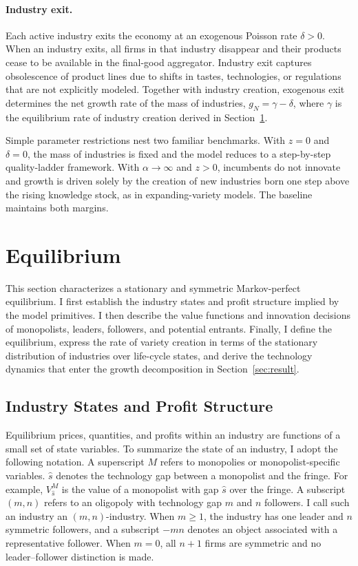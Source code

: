 \documentclass[12pt]{article}
\begin{document}
\paragraph{Industry exit.}

Each active industry exits the economy at an exogenous Poisson rate \(\delta > 0\). When an industry exits, all firms in that industry disappear and their products cease to be available in the final-good aggregator. Industry exit captures obsolescence of product lines due to shifts in tastes, technologies, or regulations that are not explicitly modeled. Together with industry creation, exogenous exit determines the net growth rate of the mass of industries, \(g_N=\gamma-\delta\), where \(\gamma\) is the equilibrium rate of industry creation derived in Section~\ref{sec:eqm}.

\bigskip

Simple parameter restrictions nest two familiar benchmarks. With \(z = 0\) and \(\delta = 0\), the mass of industries is fixed and the model reduces to a step-by-step quality-ladder framework. With \(\alpha\rightarrow\infty\) and \(z > 0\), incumbents do not innovate and growth is driven solely by the creation of new industries born one step above the rising knowledge stock, as in expanding-variety models. The baseline maintains both margins.

\section{Equilibrium}\label{sec:eqm}

This section characterizes a stationary and symmetric Markov-perfect equilibrium. I first establish the industry states and profit structure implied by the model primitives. I then describe the value functions and innovation decisions of monopolists, leaders, followers, and potential entrants. Finally, I define the equilibrium, express the rate of variety creation in terms of the stationary distribution of industries over life-cycle states, and derive the technology dynamics that enter the growth decomposition in Section~\ref{sec:result}.

\subsection{Industry States and Profit Structure}

Equilibrium prices, quantities, and profits within an industry are functions of a small set of state variables. To summarize the state of an industry, I adopt the following notation. A superscript \(M\) refers to monopolies or monopolist-specific variables. \(\hat{s}\) denotes the technology gap between a monopolist and the fringe. For example, \(V^M_{\hat{s}}\) is the value of a monopolist with gap \(\hat{s}\) over the fringe. A subscript \((m,n)\) refers to an oligopoly with technology gap \(m\) and \(n\) followers. I call such an industry an \((m,n)\)-industry. When \(m\geq1\), the industry has one leader and \(n\) symmetric followers, and a subscript \(-mn\) denotes an object associated with a representative follower. When \(m=0\), all \(n+1\) firms are symmetric and no leader--follower distinction is made.
\end{document}
